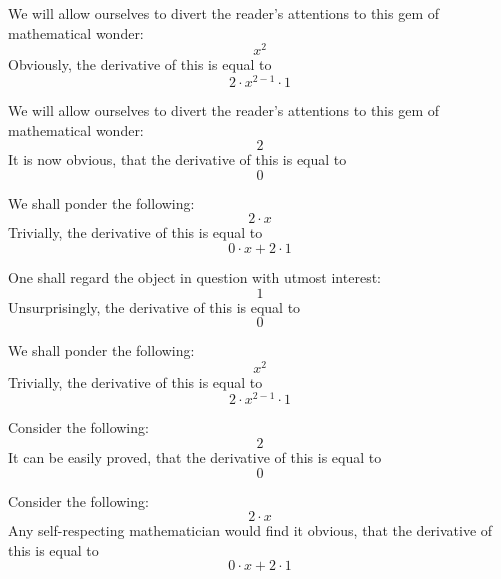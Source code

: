 \documentclass{article}
\begin{document}
We will allow ourselves to divert the reader's attentions to this gem of mathematical wonder:
\begin{equation}
x ^{2 } 
\end{equation}
Obviously, the derivative of this is equal to
\begin{equation}
2 \cdot x ^{2 - 1 } \cdot 1 
\end{equation}

We will allow ourselves to divert the reader's attentions to this gem of mathematical wonder:
\begin{equation}
2 
\end{equation}
It is now obvious, that the derivative of this is equal to
\begin{equation}
0 
\end{equation}

We shall ponder the following:
\begin{equation}
2 \cdot x 
\end{equation}
Trivially, the derivative of this is equal to
\begin{equation}
0 \cdot x + 2 \cdot 1 
\end{equation}

One shall regard the object in question with utmost interest:
\begin{equation}
1 
\end{equation}
Unsurprisingly, the derivative of this is equal to
\begin{equation}
0 
\end{equation}

We shall ponder the following:
\begin{equation}
x ^{2 } 
\end{equation}
Trivially, the derivative of this is equal to
\begin{equation}
2 \cdot x ^{2 - 1 } \cdot 1 
\end{equation}

Consider the following:
\begin{equation}
2 
\end{equation}
It can be easily proved, that the derivative of this is equal to
\begin{equation}
0 
\end{equation}

Consider the following:
\begin{equation}
2 \cdot x 
\end{equation}
Any self-respecting mathematician would find it obvious, that the derivative of this is equal to
\begin{equation}
0 \cdot x + 2 \cdot 1 
\end{equation}
\end{document}
